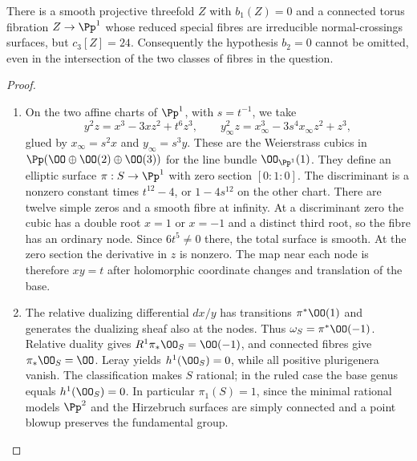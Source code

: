 \begin{proposition}[P4.10]\hypertarget{tag-02WH}{}\label{night:P4.10}\label{stmt:P4.10}

There is a smooth projective threefold $Z$ with $b_1(Z)=0$ and a
connected torus fibration $Z\to\Pp^1$ whose reduced special fibres
are irreducible normal-crossings surfaces, but $c_3[Z]=24$.
Consequently the hypothesis $b_2=0$ cannot be omitted, even in the
intersection of the two classes of fibres in the question.
\end{proposition}
\begin{proof}

\begin{enumerate}[label={$\langle1\rangle$\arabic*.},leftmargin=*]
\item On the two affine charts of $\Pp^1$, with $s=t^{-1}$, we take
\[
 y^2z=x^3-3xz^2+t^6z^3,\qquad
 y_\infty^2z=x_\infty^3-3s^4x_\infty z^2+z^3,
\]
glued by $x_\infty=s^2x$ and $y_\infty=s^3y$. These are the
Weierstrass cubics in $\Pp(\OO\oplus\OO(2)\oplus\OO(3))$ for
the line bundle $\OO_{\Pp^1}(1)$. They define an elliptic surface
$\pi:S\to\Pp^1$ with zero section $[0:1:0]$. The discriminant
is a nonzero constant times $t^{12}-4$, or $1-4s^{12}$ on the
other chart. There are twelve simple zeros and a smooth fibre at
infinity. At a discriminant zero the cubic has a double root
$x=1$ or $x=-1$ and a distinct third root, so the fibre has an
ordinary node. Since $6t^5\ne0$ there, the total surface is smooth.
At the zero section the derivative in $z$ is nonzero. The map near
each node is therefore $xy=t$ after holomorphic coordinate changes
and translation of the base.

\item The relative dualizing differential $dx/y$ has transitions
$\pi^*\OO(1)$ and generates the dualizing sheaf also at the nodes.
Thus $\omega_S=\pi^*\OO(-1)$. Relative duality gives
$R^1\pi_*\OO_S=\OO(-1)$, and connected fibres give
$\pi_*\OO_S=\OO$. Leray yields $h^1(\OO_S)=0$, while all
positive plurigenera vanish. The classification \cite[Chapter~VI, Theorem~1.1, p.~243]{BHPV2004E} makes $S$
rational; in the ruled case the base genus equals $h^1(\OO_S)=0$.
In particular $\pi_1(S)=1$, since the minimal rational models
$\Pp^2$ and the Hirzebruch surfaces are simply connected and a
point blowup preserves the fundamental group.


\end{enumerate}
\end{proof}
